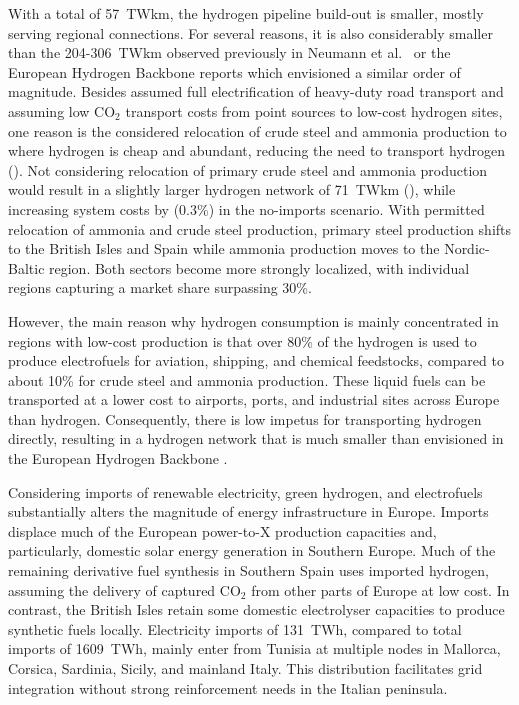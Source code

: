 
With a total of 57~TWkm, the hydrogen pipeline build-out is smaller, mostly
serving regional connections. For several reasons, it is also considerably
smaller than the 204-306~TWkm observed previously in Neumann et
al.~\cite{neumannPotentialRoleHydrogen2023} or the European Hydrogen Backbone
reports\cite{gasforclimateEuropeanHydrogen2022} which envisioned a similar order
of magnitude. Besides assumed full electrification of heavy-duty road
transport\cite{} and assuming low CO$_2$ transport costs from point sources to
low-cost hydrogen sites,\cite{hofmannH2CO2Network2024} one reason is the
considered relocation of crude steel and ammonia production to where hydrogen is
cheap and abundant, reducing the need to transport hydrogen
(). Not considering relocation of primary crude steel
and ammonia production would result in a slightly larger hydrogen network of
71~TWkm (), while increasing system costs by
 (0.3\%) in the no-imports scenario. With permitted relocation of
ammonia and crude steel production, primary steel production shifts to the
British Isles and Spain while ammonia production moves to the Nordic-Baltic
region. Both sectors become more strongly localized, with individual regions
capturing a market share surpassing 30\%.

However, the main reason why hydrogen consumption is mainly concentrated in
regions with low-cost production is that over 80\% of the hydrogen is used to
produce electrofuels for aviation, shipping, and chemical feedstocks, compared
to about 10\% for crude steel and ammonia production. These liquid fuels can be
transported at a lower cost to airports, ports, and industrial sites across Europe
than hydrogen. Consequently, there is low impetus for transporting hydrogen
directly, resulting in a hydrogen network that is much smaller than envisioned
in the European Hydrogen Backbone \cite{gasforclimateEuropeanHydrogen2022}.


Considering imports of renewable electricity, green hydrogen, and electrofuels
substantially alters the magnitude of energy infrastructure in Europe. Imports
displace much of the European power-to-X production capacities and,
particularly, domestic solar energy generation in Southern Europe. Much of the
remaining derivative fuel synthesis in Southern Spain uses imported hydrogen,
assuming the delivery of captured CO$_2$ from other parts of Europe at low
cost.\cite{hofmannH2CO2Network2024} In contrast, the British Isles retain some
domestic electrolyser capacities to produce synthetic fuels locally. Electricity
imports of 131~TWh, compared to total imports of 1609~TWh, mainly enter from
Tunisia at multiple nodes in Mallorca, Corsica, Sardinia, Sicily, and mainland
Italy. This distribution facilitates grid integration without strong
reinforcement needs in the Italian peninsula.

